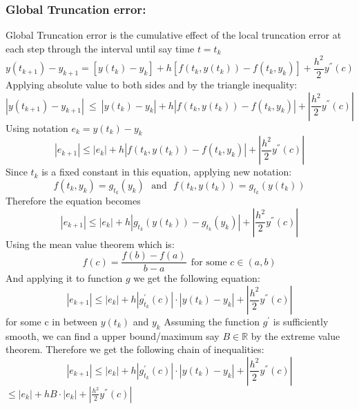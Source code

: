 \documentclass[11pt,a4paper]{amsart}
\begin{document}
\subsubsection{Global Truncation error:} \cite{buchanan, atkinson} Global Truncation error is the cumulative effect of the local truncation error at each step through the interval until say time $t = t_k$
$$\displaystyle y(t_{k+1}) - y_{k+1} = [y(t_k)-y_k] + h[f(t_k,y(t_k)) - f(t_k, y_k)] + \frac{h^2}{2}y^{''}(c)$$
Applying absolute value to both sides and by the triangle inequality:
$$|y(t_{k+1}) - y_{k+1}| \ \leq \ |y(t_k)-y_k| + h|f(t_k,y(t_k)) - f(t_k, y_k)| + |\frac{h^2}{2}y^{''}(c)|$$
Using notation $e_k = y(t_k)-y_k$
$$|e_{k+1}| \leq |e_k| + h|f(t_k,y(t_k)) - f(t_k, y_k)| + |\frac{h^2}{2}y^{''}(c)|$$
Since $t_k$ is a fixed constant in this equation, applying new notation:
$$f(t_k, y_k) = g_{t_k}(y_k) \ \ \ \text{and} \ \ \ f(t_k, y(t_k)) = g_{t_k}(y(t_k))$$
Therefore the equation becomes 
$$|e_{k+1}| \leq |e_k| + h|g_{t_k}(y(t_k)) - g_{t_k}(y_k)| + |\frac{h^2}{2}y^{''}(c)|$$
Using the mean value theorem which is:
$$f(c) = \frac{f(b) - f(a)}{b-a} \ \ \text{for some } c \in (a,b)$$
And applying it to function $g$ we get the following equation:
$$|e_{k+1}| \leq |e_k| + h|g_{t_k}^{'}(c)|\cdot|y(t_k) - y_k| + |\frac{h^2}{2}y^{''}(c)|$$
for some c in between $y(t_k)$ and $y_k$
Assuming the function $g^{'}$ is sufficiently smooth, we can find a upper bound/maximum say $B \in \mathbb{R}$ by the extreme value theorem. Therefore we get the following chain of inequalities:
$$|e_{k+1}| \leq |e_k| + h|g_{t_k}^{'}(c)|\cdot|y(t_k) - y_k| + |\frac{h^2}{2}y^{''}(c)|$$
\hspace{144px} $\displaystyle \leq |e_k| + hB\cdot|e_k| + |\frac{h^2}{2}y^{''}(c)|$ \\ 
\end{document}
